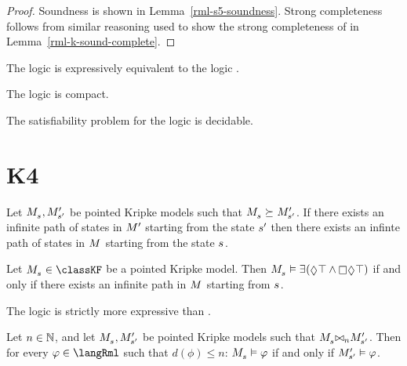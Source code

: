 \begin{proof}
Soundness is shown in Lemma~\ref{rml-s5-soundness}.
Strong completeness follows from similar reasoning used to show the strong completeness of \logicRmlK{} in Lemma~\ref{rml-k-sound-complete}.
\end{proof}

\begin{corollary}
The logic \logicRmlS{} is expressively equivalent to the logic \logicS{}.
\end{corollary}

\begin{corollary}
The logic \logicRmlS{} is compact.
\end{corollary}

\begin{corollary}
The satisfiability problem for the logic \logicRmlS{} is decidable.
\end{corollary}

\section{K4}

\begin{lemma}
Let $\kPModel{\kStateS}, \kPModelP{\kStateSP}$ be pointed Kripke models such that $\kPModel{\kStateS} \simulates \kPModelP{\kStateSP}$.
If there exists an infinite path of states in ${M^{\prime}_{}}$ starting from the state ${s}^{\prime}$ then there exists an infinte path of states in $\kModel$ starting from the state $\kStateS$.
\end{lemma}


\begin{lemma}
Let $\kPModel{\kStateS} \in \classKF$ be a pointed Kripke model.
Then $\kPModel{\kStateS} \entails \somerefs(\possible \top \land \necessary \possible \top)$ if and only if there exists an infinite path in $\kModel$ starting from $\kStateS$.
\end{lemma}


\begin{theorem}
The logic \logicRmlKF{} is strictly more expressive than \logicKF{}.
\end{theorem}


\begin{lemma}
    Let $n \in \mathbb{N}$, and let $\kPModel{\kStateS}, \kPModelP{\kStateSP}$ be pointed Kripke models such that $\kPModel{\kStateS} \mutualrefines[n] \kPModelP{\kStateSP}$.
    Then for every $\phi \in \langRml$ such that $d(\phi) \leq n$: $\kPModel{\kStateS} \entails \phi$ if and only if ${M^{\prime}_{{s}^{\prime}}} \vDash \varphi$.
\end{lemma}

